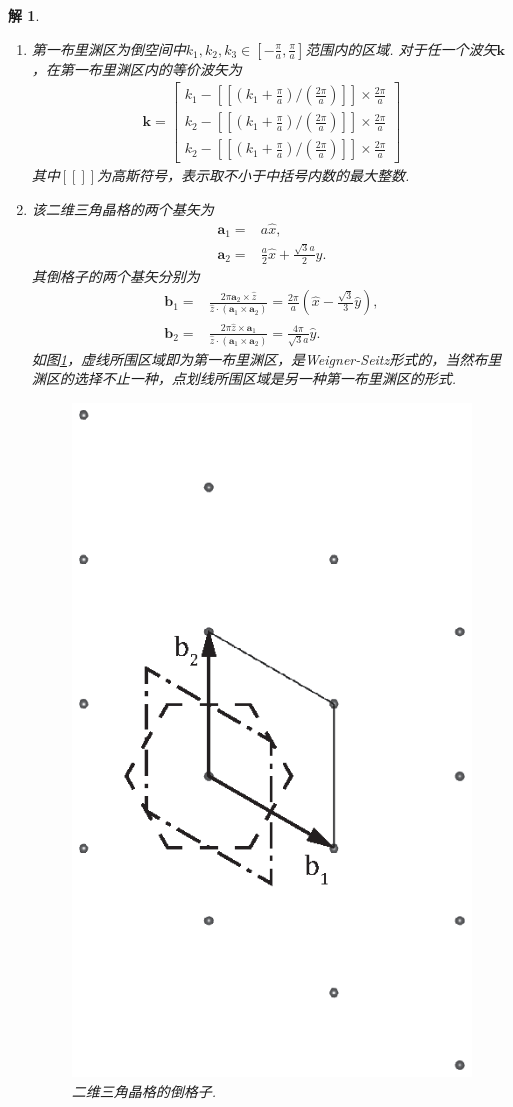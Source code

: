 \documentclass[UTF8,10pt,a4paper]{article}
\theoremstyle{Problem}
\theoremstyle{Solution}
\newtheorem*{sol}{解}
\begin{document}
\begin{sol}
    \begin{enumerate}
        \item[(a)] 第一布里渊区为倒空间中$k_1,k_2,k_3\in[-\frac{\pi}{a},\frac{\pi}{a}]$范围内的区域. 对于任一个波矢$\bm{k}$，在第一布里渊区内的等价波矢为
        \begin{align}
            \bm{k}=\left[\begin{matrix}
                k_1-[[(k_1+\frac{\pi}{a})/(\frac{2\pi}{a})]]\times\frac{2\pi}{a}\\
                k_2-[[(k_1+\frac{\pi}{a})/(\frac{2\pi}{a})]]\times\frac{2\pi}{a}\\
                k_2-[[(k_1+\frac{\pi}{a})/(\frac{2\pi}{a})]]\times\frac{2\pi}{a}
            \end{matrix}\right]
        \end{align}
        其中$[[]]$为高斯符号，表示取不小于中括号内数的最大整数.
        \item[(b)] 该二维三角晶格的两个基矢为
        \begin{align*}
            \bm{a}_1=&a\hat{x},\\
            \bm{a}_2=&\frac{a}{2}\hat{x}+\frac{\sqrt{3}a}{2}\hat{y}.
        \end{align*}
        其倒格子的两个基矢分别为
        \begin{align*}
            \bm{b}_1=&\frac{2\pi\bm{a}_2\times\hat{z}}{\hat{z}\cdot(\bm{a}_1\times\bm{a}_2)}=\frac{2\pi}{a}(\hat{x}-\frac{\sqrt{3}}{3}\hat{y}),\\
            \bm{b}_2=&\frac{2\pi\hat{z}\times\bm{a}_1}{\hat{z}\cdot(\bm{a}_1\times\bm{a}_2)}=\frac{4\pi}{\sqrt{3}a}\hat{y}.
        \end{align*}
        如图\ref{5-RL}，虚线所围区域即为第一布里渊区，是Weigner-Seitz形式的，当然布里渊区的选择不止一种，点划线所围区域是另一种第一布里渊区的形式.
        \begin{figure}[h]
            \centering
            \includegraphics[width=.2\textwidth]{5.eps}
            \caption{二维三角晶格的倒格子.}
            \label{5-RL}

\end{figure}
\end{enumerate}
\end{sol}
\end{document}
